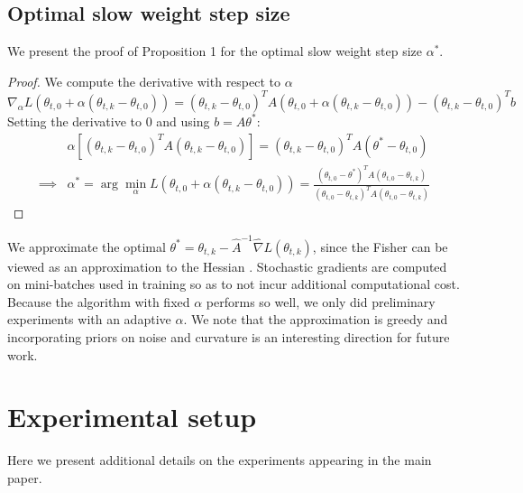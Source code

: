 \documentclass{article}
\begin{document}
\subsection{Optimal slow weight step size}
\label{app:optimal-slow}
We present the proof of Proposition 1 for the optimal slow weight step size $\alpha^*$.

\begin{proof}
We compute the derivative with respect to $\alpha$ 
\[\nabla_{\alpha} L(\theta_{t,0} + \alpha (\theta_{t,k} - \theta_{t,0}))
=  (\theta_{t,k} - \theta_{t,0})^T A (\theta_{t,0} + \alpha (\theta_{t,k} - \theta_{t,0})) - (\theta_{t,k} - \theta_{t,0})^T b\]
Setting the derivative to 0 and using $b = A \theta^*$:
\begin{align}
    &\alpha [ (\theta_{t,k} - \theta_{t,0})^T A  (\theta_{t,k} - \theta_{t,0})] =  (\theta_{t,k} - \theta_{t,0})^T A (\theta^* - \theta_{t,0}) \\ 
    \implies &\alpha^* = \arg \min_{\alpha} L(\theta_{t,0} + \alpha (\theta_{t,k} - \theta_{t,0})) = \frac{(\theta_{t,0} - \theta^*)^T A(\theta_{t,0} - \theta_{t, k})}{(\theta_{t,0}  - \theta_{t,k})^T A (\theta_{t,0} - \theta_{t,k})}  
\end{align}
\end{proof}

We approximate the optimal $\theta^* = \theta_{t,k}  - \hat{A}^{-1} \hat{\nabla} L(\theta_{t,k})$, since the Fisher can be viewed as an approximation to the Hessian \cite{martens2014new}. Stochastic gradients are computed on mini-batches used in training so as to not incur additional computational cost.  Because the algorithm with fixed $\alpha$ performs so well, we only did preliminary experiments with an adaptive $\alpha$. We note that the approximation is greedy and incorporating priors on noise and curvature is an interesting direction for future work. \section{Experimental setup}
\label{app:experiments}

Here we present additional details on the experiments appearing in the main paper. 
\end{document}
